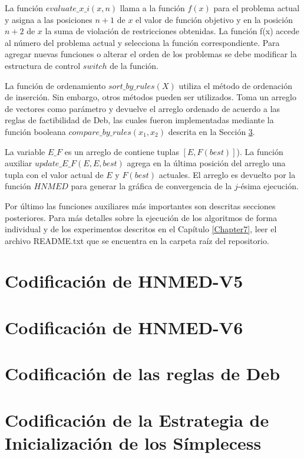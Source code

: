  La función $evaluate\_x\_i(x,n)$ llama a la función $f(x)$ para el problema actual y asigna a las posiciones $n+1$  de $x$ el valor de función objetivo y en la posición $n+2$ de $x$ la suma de violación de restricciones obtenidas. La función f(x) accede al número del problema actual y selecciona la función correspondiente. Para agregar nuevas funciones o alterar el orden de los problemas se debe modificar la estructura de control $switch$ de la función.
 
 La función de ordenamiento $sort\_by\_rules(X)$ utiliza el método de ordenación de inserción. Sin embargo, otros métodos pueden ser utilizados. Toma un arreglo de vectores como parámetro y devuelve el arreglo ordenado de acuerdo a las reglas de factibilidad de Deb, las cuales fueron implementadas mediante la función booleana $compare\_by\_rules(x_1,x_2)$ descrita en la Sección \ref{sec:Debs rules}.
 
 La variable $E\_F$ es un arreglo de contiene tuplas $\left[ E,F(best)\right]$). La función auxiliar $update\_E\_F(E,E,best)$ agrega en la última posición del arreglo una tupla con el valor actual de $E$ y $F(best)$ actuales. El arreglo es devuelto por la función $HNMED$ para generar la gráfica de convergencia de la $j$-ésima ejecución.
 
Por último las funciones auxiliares más importantes son descritas secciones posteriores. Para más detalles sobre la ejecución de los algoritmos de forma individual y de los experimentos descritos en el Capítulo \ref{Chapter7}, leer el archivo README.txt que se encuentra en la carpeta raíz del repositorio.     
 
\section{Codificación de HNMED-V5 }

\section{Codificación de HNMED-V6 }

\section{Codificación de las reglas de Deb}\label{sec:Debs rules}

\section{Codificación de la Estrategia de Inicialización de los Símplecess}

